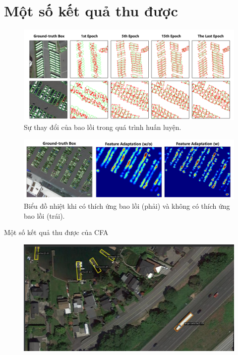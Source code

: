 \documentclass[11pt]{beamer}
\theoremstyle{definition}
\theoremstyle{plain}
\theoremstyle{plain}
\theoremstyle{remark}
\begin{document}
	\section{Một số kết quả thu được}
	\begin{frame}
		
\begin{figure}
	\centering
	\includegraphics[width=1\linewidth]{Figures/convex_hull_evaluation_when_training}
	\caption{Sự thay đổi của bao lồi trong quá trình huấn luyện.}
	\label{fig:convexhullevaluationwhentraining}
\end{figure}
\end{frame}
	\begin{frame}
\begin{figure}
	\centering
	\includegraphics[width=1\linewidth]{Figures/heat_map_comparision_of_CFA}
	\caption{Biểu đồ nhiệt khi có thích ứng bao lồi (phải) và không có thích ứng bao lồi (trái).}
	\label{fig:heatmapcomparisionofcfa}
\end{figure}
		
	\end{frame}
\begin{frame}{Một số kết quả thu được của CFA}
			
	\begin{figure}
		\centering
		\includegraphics[width=1\linewidth]{res_mmrotate3}
	
		\label{fig:resmmrotate3}
	\end{figure}
\end{frame}
\end{document}
